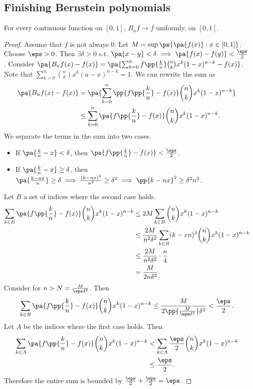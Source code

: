 \documentclass[11pt]{scrartcl}
\numberwithin{equation}{section}
\begin{document}
\subsection{Finishing Bernstein polynomials}
\begin{theorem}
    \label{thm:bernstein-convergence}
    For every continuous function on $[0,1]$, $B_nf\to f$ uniformly.
    on $[0,1]$.
\end{theorem}
\begin{proof}
    Assume that $f$ is not always $0$. Let 
    $M=\sup\ps{\pa{f(x)}: x\in [0,1]}$.
    Choose $\eps>0$. Then $\exists \delta>0$ s.t. $\pa{x-y}<\delta
    \implies \pa{f(x)-f(y)}<\frac{\eps}{2}$.
    Consider
    $\pa{B_nf(x)-f(x)} = \pa{\sum_{k=0}^{n}f\pp{\frac{k}{n}}\binom{n}{k}x^k(1-x)^{n-k}-f(x)}$. Note that $\sum_{k=0}^{n}\binom{n}{k}x^k(a-x)^{n-k}=1$. We can rewrite the sum as 
    \begin{align*}
        \pa{B_nf(x)-f(x)} &= \pa{\sum_{k=0}^{n}\pp{f\pp{\frac{k}{n}} - f(x)} \binom{n}{k} x^k (1-x)^{n-k}} \\ 
        &\leq \sum_{k=0}^{n}\pa{f\pp{\frac{k}{n}} - f(x)} \binom{n}{k} x^k (1-x)^{n-k}.
    \end{align*}
    We separate the terms in the sum into two cases.
    \begin{itemize}
        \item If $\pa{\frac{k}{n}-x}<\delta$, then 
        $\pa{f\pp{\frac{k}{n}}-f(x)}<\frac{\eps}{2}$.
        \item If $\pa{\frac{k}{n}-x}\geq\delta$, then 
        $\pa{\frac{k-nx}{n}}\geq \delta \implies 
        \frac{(k-nx)^2}{n^2}\geq\delta^2 \implies \pp{k-nx}^2\geq \delta^2n^2$.
    \end{itemize}
    Let $B$ a set of indices where the second case holds.
    \begin{align*}
        \sum_{k\in B}\pa{f\pp{\frac{k}{n}} - f(x)} \binom{n}{k} x^k (1-x)^{n-k}
        &\leq 2M\sum_{k\in B}\binom{n}{k} x^k (1-x)^{n-k} \\
        &\leq \frac{2M}{n^2\delta^2}\sum_{k\in B}(k-xn)^2\binom{n}{k} x^k (1-x)^{n-k} \\
        &\leq \frac{2M}{n^2\delta^2}\cdot\frac{n}{4} \\
        &= \frac{M}{2n\delta^2}.
    \end{align*}
    Consider for $n>N=\frac{M}{\eps\delta^2}$.
    Then 
    \[
        \sum_{k\in B}\pa{f\pp{\frac{k}{n}} - f(x)} \binom{n}{k} x^k (1-x)^{n-k}\leq \frac{M}{2\pp{\frac{M}{\eps\delta^2}}\delta^2} < \frac{\eps}{2}.
    \]
    Let $A$ be the indices where the first case holds.
    Then 
    \begin{align*}
        \sum_{k\in A}
        \pa{f\pp{\frac{k}{n}} - f(x)} \binom{n}{k} x^k (1-x)^{n-k}
        &<
        \sum_{k\in A} \frac{\eps}{2} \binom{n}{k} x^k (1-x)^{n-k}\\
        &\leq 
        \frac{\eps}{2}.
    \end{align*}
    Therefore the entire sum is bounded by 
    $\frac{\eps}{2}+\frac{\eps}{2}=\eps$.
\end{proof}
\end{document}
